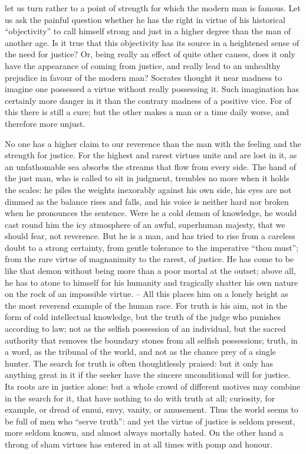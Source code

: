  let us turn rather to a point of
strength for which the modern man is famous. Let us ask the painful
question whether he has the right in virtue of his historical
\enquote{objectivity} to call himself strong and just in a higher degree than
the man of another age. Is it true that this objectivity has its
source in a heightened sense of the need for justice? Or, being
really an effect of quite other causes, does it only have the
appearance of coming from justice, and really lead to an unhealthy
prejudice in favour of the modern man? Socrates thought it near
madness to imagine one possessed a virtue without really possessing
it. Such imagination has certainly more danger in it than the
contrary madness of a positive vice. For of this there is still a
cure; but the other makes a man or a time daily worse, and therefore
more unjust.

No one has a higher claim to our reverence than the man with the
feeling and the strength for justice. For the highest and rarest
virtues unite and are lost in it, as an unfathomable sea absorbs the
streams that flow from every side. The hand of the just man, who is
called to sit in judgment, trembles no more when it holds the scales:
he piles the weights inexorably against his own side, his eyes are
not dimmed as the balance rises and falls, and his voice is neither
hard nor broken when he pronounces the sentence. Were he a cold demon
of knowledge, he would cast round him the icy atmosphere of an awful,
superhuman majesty, that we should fear, not reverence. But he is a
man, and has tried to rise from a careless doubt to a strong
certainty, from gentle tolerance to the imperative \enquote{thou must}; from
the rare virtue of magnanimity to the rarest, of justice. He has come
to be like that demon without being more than a poor mortal at the
outset; above all, he has to atone to himself for his humanity and
tragically shatter his own nature on the rock of an impossible
virtue. -- All this places him on a lonely height as the most reverend
example of the human race. For truth is his aim, not in the form of
cold intellectual knowledge, but the truth of the judge who punishes
according to law; not as the selfish possession of an individual, but
the sacred authority that removes the boundary stones from all
selfish possessions; truth, in a word, as the tribunal of the world,
and not as the chance prey of a single hunter. The search for truth
is often thoughtlessly praised: but it only has anything great in it
if the seeker have the sincere unconditional will for justice. Its
roots are in justice alone: but a whole crowd of different motives
may combine in the search for it, that have nothing to do with truth
at all; curiosity, for example, or dread of ennui, envy, vanity, or
amusement. Thus the world seems to be full of men who \enquote{serve truth}:
and yet the virtue of justice is seldom present, more seldom known,
and almost always mortally hated. On the other hand a throng of sham
virtues has entered in at all times with pomp and honour.

